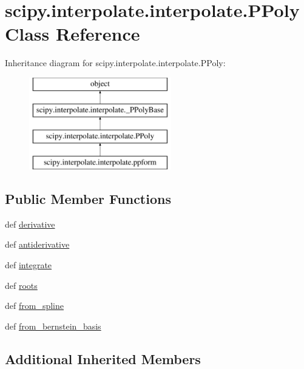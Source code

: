 \hypertarget{classscipy_1_1interpolate_1_1interpolate_1_1PPoly}{}\section{scipy.\+interpolate.\+interpolate.\+P\+Poly Class Reference}
\label{classscipy_1_1interpolate_1_1interpolate_1_1PPoly}
Inheritance diagram for scipy.\+interpolate.\+interpolate.\+P\+Poly\+:\begin{figure}[H]
\begin{center}
\leavevmode
\includegraphics[height=4.000000cm]{classscipy_1_1interpolate_1_1interpolate_1_1PPoly}
\end{center}
\end{figure}
\subsection*{Public Member Functions}
\begin{DoxyCompactItemize}
\item 
def \hyperlink{classscipy_1_1interpolate_1_1interpolate_1_1PPoly_ab92a0406f25cc8a12a9b4a69ef3f1aa1}{derivative}
\item 
def \hyperlink{classscipy_1_1interpolate_1_1interpolate_1_1PPoly_a5e23c9feb5fbfb60c2ae087066c23878}{antiderivative}
\item 
def \hyperlink{classscipy_1_1interpolate_1_1interpolate_1_1PPoly_a671fc0e3cbb7b2b5e9b93d8ef1a48d06}{integrate}
\item 
def \hyperlink{classscipy_1_1interpolate_1_1interpolate_1_1PPoly_a319b65c1f2a159fb3ca1f73cb73e3423}{roots}
\item 
def \hyperlink{classscipy_1_1interpolate_1_1interpolate_1_1PPoly_adae115fadced1e713df043474923b542}{from\+\_\+spline}
\item 
def \hyperlink{classscipy_1_1interpolate_1_1interpolate_1_1PPoly_ac12ff4a21309d27add95b0acdc4e8ca4}{from\+\_\+bernstein\+\_\+basis}
\end{DoxyCompactItemize}
\subsection*{Additional Inherited Members}


